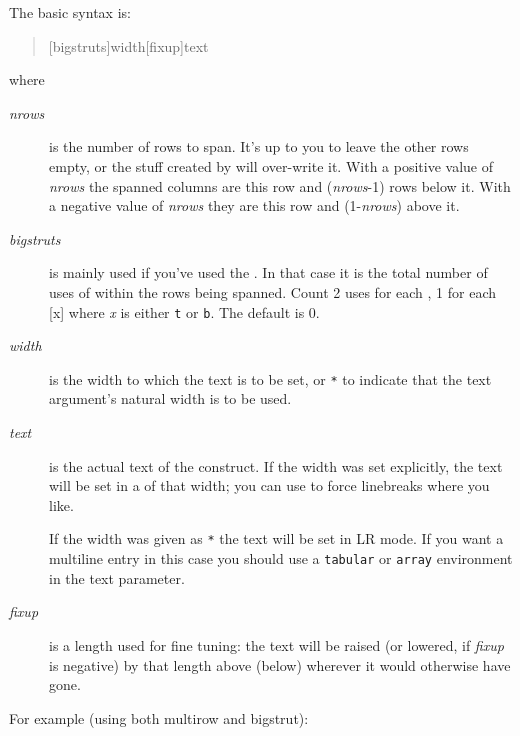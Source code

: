 \documentclass[a4paper]{article}
\begin{document}
The basic syntax is:
\begin{quote}
  [bigstruts]{width}[fixup]{text}
\end{quote}
where
\begin{description}
\item[\emph{nrows}] is the number of rows to span.  It's up to you to
  leave the other rows empty, or the stuff created by 
  will over-write it. With a positive value of \emph{nrows} the
  spanned columns are this row and (\emph{nrows}-1) rows below
  it. With a negative value of \emph{nrows} they are this row and
  (1-\emph{nrows}) above it. 
\item[\emph{bigstruts}] is mainly used if you've used the
  .  In that case it is the total number of uses of
   within the rows being spanned.  Count 2 uses for each
  , 1 for each [x] where \emph{x} is
  either \texttt{t} or \texttt{b}.  The default is 0.
\item[\emph{width}] is the width to which the text is to be set, or
  \texttt{*} to indicate that the text argument's natural width is to
  be used.
\item[\emph{text}] is the actual text of the construct.  If the width
  was set explicitly, the text will be set in a  of that
  width; you can use \bsbs{} to force linebreaks where you like.

  If the width was given as \texttt{*} the text will be set in LR
  mode.  If you want a multiline entry in this case you should use a
  \texttt{tabular} or \texttt{array} environment in the text
  parameter.
\item[\emph{fixup}] is a length used for fine tuning: the text will be
  raised (or lowered, if \emph{fixup} is negative) by that length
  above (below) wherever it would otherwise have gone.
\end{description}
For example (using both multirow and bigstrut):
\end{document}
